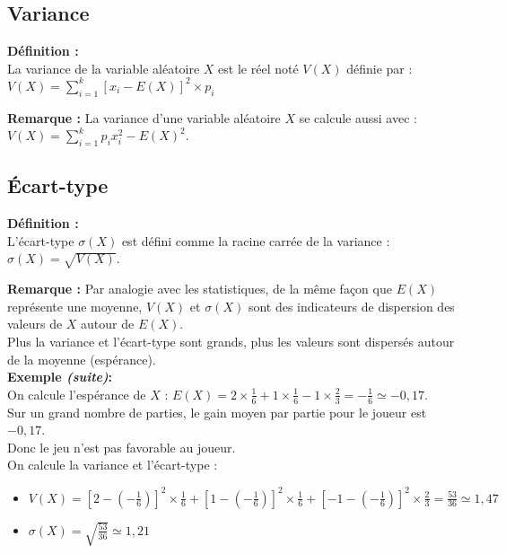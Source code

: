 \documentclass{article}
\begin{document}
\subsection{Variance}

\begin{mdframed}[style=definitionStyle]
	\textbf{Définition :} ~\\
	La variance de la variable aléatoire $X$ est le réel noté $V(X)$ définie par :\\
	$\displaystyle V(X)=\sum_{i=1}^{k}\left[x_i-E(X)\right]^2\times p_i$
\end{mdframed}

\textbf{Remarque :} La variance d'une variable aléatoire $X$ se calcule aussi avec : $V(X)=\sum_{i=1}^{k} p_i x_i^2-E(X)^2$.
\subsection{Écart-type}

\begin{mdframed}[style=definitionStyle]
	\textbf{Définition :} ~\\
	L'écart-type $\sigma(X)$ est défini comme la racine carrée de la variance : $\sigma(X)=\sqrt{V(X)}$.
\end{mdframed}

\textbf{Remarque :} Par analogie avec les statistiques, de la même façon que $E(X)$ représente une moyenne, $V(X)$ et $\sigma(X)$ sont des indicateurs de dispersion des valeurs de $X$ autour de $E(X)$. \\
Plus la variance et l'écart-type sont grands, plus les valeurs sont dispersés autour de la moyenne (espérance). \\

\textbf{Exemple \emph{(suite)}:} ~\\
On calcule l'espérance de $X$ :
$\displaystyle E(X)=2\times\frac{1}{6}+1\times\frac{1}{6}-1\times\frac{2}{3}=-\frac{1}{6}\simeq-0,17$. \\
Sur un grand nombre de parties, le gain moyen par partie pour le joueur est $-0,17$. \\Donc le jeu n'est pas favorable au joueur. \\

On calcule la variance et l'écart-type :
\begin{itemize}
	\item $\displaystyle V(X)=\left[2-\left(-\frac{1}{6}\right)\right]^2\times \frac{1}{6}+\left[1-\left(-\frac{1}{6}\right)\right]^2\times \frac{1}{6}+\left[-1-\left(-\frac{1}{6}\right)\right]^2\times \frac{2}{3}=\frac{53}{36}\simeq1,47$
	\item $\displaystyle \sigma(X)=\sqrt{\frac{53}{36}}\simeq1,21$
\end{itemize}
\end{document}
